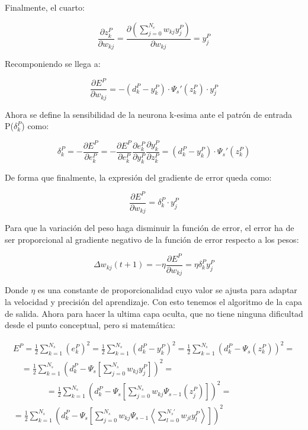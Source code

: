 \documentclass[12pt]{article}
\numberwithin{equation}{section}
\begin{document}
Finalmente, el cuarto:

\begin{equation}
\frac{\partial z^P_k}{\partial w_{kj}}=\frac{\partial \left(\sum_{j=0}^{N_e} w_{kj} y_j^P\right)}{\partial w_{kj}} = y_j^P
\end{equation}

Recomponiendo se llega a:

\begin{equation}
\frac{\partial E^P}{\partial w_{kj}} =
-(d_k^P-y_k^P) \cdot \Psi _s'(z_k^P) \cdot y_j^P
\end{equation}

Ahora se define la sensibilidad de la neurona k-esima ante el patrón de entrada P($\delta_k^P$) como:

\begin{equation}
\delta _k^P = - \frac{\partial E^P}{\partial e^P_k}=-
\frac{\partial E^P}{\partial e_{k}^P} \frac{\partial e^P_k}{\partial y_{k}^P} \frac{\partial y^P_k}{\partial z_{k}^P} = (d_k^P-y_k^P) \cdot \Psi _s'(z_k^P)
\end{equation}

De forma que finalmente, la expresión del gradiente de error queda como:

\begin{equation}
\frac{\partial E^P}{\partial w_{kj}} = \delta_k^P \cdot y_j^P
\end{equation}

Para que la variación del peso haga disminuir la función de error, el error ha de ser proporcional al gradiente negativo de la función de error respecto a los pesos:

\begin{equation}
\Delta w_{kj}(t+1) = -\eta \frac{\partial E^P}{\partial w_{kj}} = \eta \delta_k^P y_j^P
\end{equation}

Donde $\eta$ es una constante de proporcionalidad cuyo valor se ajusta para adaptar la velocidad y precisión del aprendizaje. Con esto tenemos el algoritmo de la capa de salida. Ahora para hacer la ultima capa oculta, que no tiene ninguna dificultad desde el punto conceptual, pero si matemática:

\begin{multline}
E^P = \frac{1}{2} \sum_{k=1}^{N_s} (e_k^P)^2=\frac{1}{2}\sum_{k=1}^{N_s}(d_k^P-y_k^P)^2 =  \frac{1}{2} \sum_{k=1}^{N_s} \left(d_k^P - \Psi _s(z_k^P)\right)^2 =\\
\quad = \frac{1}{2} \sum_{k=1}^{N_s} \left(d_k^P - \Psi _s \left[ \sum_{j=0}^{N_s} w_{kj} y_j^P\right]\right)^2 = \\
\qquad \qquad = \frac{1}{2} \sum_{k=1}^{N_s} \left(d_k^P - \Psi _s \left[ \sum_{j=0}^{N_s} w_{kj}\Psi _{s-1}(z_j^P)\right]\right)^2 =\\
= \frac{1}{2} \sum_{k=1}^{N_s} \left(d_k^P - \Psi _s \left[ \sum_{j=0}^{N_s} w_{kj}\Psi _{s-1} \left\langle \sum_{l=0}^{N_s'} w_{jl} y_l^P\right\rangle \right] \right)^2
\end{multline}
\end{document}
